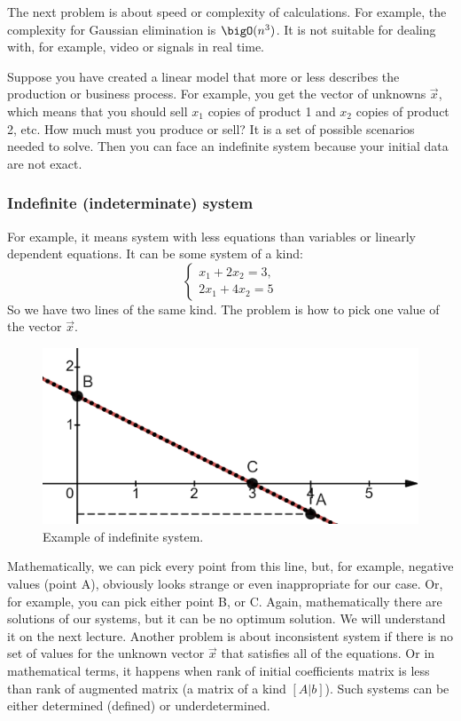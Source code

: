     \par
    The next problem is about speed or complexity of calculations. For example, the complexity for Gaussian elimination is $\bigO(n^3)$. It is not suitable for dealing with, for example, video or signals in real time.
    \par 
    Suppose you have created a linear model that more or less describes the production or business process. For example, you get the vector of unknowns $\vec{x}$, which means that you should sell $x_1$ copies of product 1 and $x_2$ copies of product 2, etc. How much must you produce or sell? It is a set of possible scenarios needed to solve. Then you can face an indefinite system because your initial data are not exact.
    \subsubsection*{Indefinite (indeterminate) system}
    For example, it means system with less equations than variables or linearly dependent equations. It can be some system of a kind:
    \[
        \left\{ \begin{array}{c}
            x_1 + 2x_2 = 3,\\
            2x_1 + 4x_2 = 5
        \end{array}
            \right.  
    \]
    So we have two lines of the same kind. The problem is how to pick one value of the vector $\vec{x}$. 
    \begin{figure}
        \includegraphics[height=0.235\columnwidth, width=0.5\columnwidth]{lectures/images/indefinite_system.png}
        \caption*{\scriptsize{Example of indefinite system.}}
        \label{fig:indefinite_system}
    \end{figure}
    Mathematically, we can pick every point from this line, but, for example, negative values (point A), obviously looks strange or even inappropriate for our case. Or, for example, you can pick either point B, or C. Again, mathematically there are solutions of our systems, but it can be no optimum solution. We will understand it on the next lecture. Another problem is about inconsistent system if there is no set of values for the unknown vector $\vec{x}$ that satisfies all of the equations. Or in mathematical terms, it happens when rank of initial coefficients matrix is less than rank of augmented matrix (a matrix of a kind $[A|b]$). Such systems can be either determined (defined) or underdetermined.
